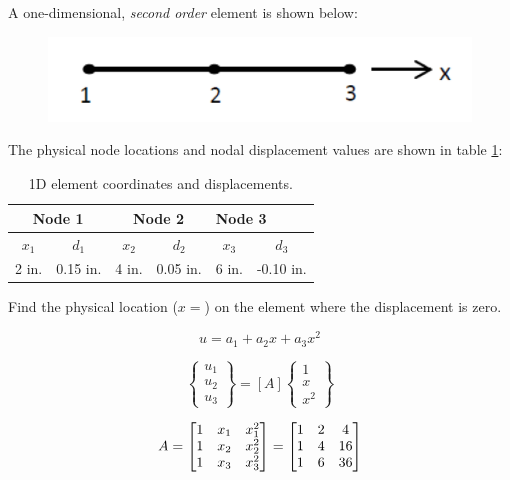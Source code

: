 \documentclass[../main.tex]{subfiles}
\begin{document}

A one-dimensional, \textit{second order} element is shown below:

\begin{figure}[h!]
    \centering
    \includegraphics[scale=0.4]{../../images/problem_2/1D_element}
\end{figure}

The physical node locations and nodal displacement values are shown in table \ref{1D_el}:

\begin{table}[h!]
    \centering
    \begin{tabular}{|c|c|c|c|c|c|}
    \hline
    \multicolumn{2}{|c|}{\textbf{Node 1}} & \multicolumn{2}{c|}{\textbf{Node 2}} & \multicolumn{2}{l|}{\textbf{Node 3}} \\ \hline
    \(x_1\) & \(d_1\) & \(x_2\) & \(d_2\) & \(x_3\) & \(d_3\) \\ \hline
    2 in. & 0.15 in. & 4 in. & 0.05 in. & 6 in. & -0.10 in. \\\hline
    \end{tabular}
    \caption{1D element coordinates and displacements.}
    \label{1D_el}
\end{table}

Find the physical location (\(x=\)) on the element where the displacement is zero.

\solution{}

\[
    u = a_1 + a_2x + a_3x^2
\]

\[
    \begin{Bmatrix}
        u_1 \\ u_2 \\u_3
    \end{Bmatrix}
     = [A]
     \begin{Bmatrix}
        1 \\ x \\x^2
    \end{Bmatrix}
\]

\[
    A = \mqty[
        1 & x_1 & x_1^2\\
        1 & x_2 & x_2^2\\
        1 & x_3 & x_3^2
    ]
    =
    \mqty[
        1 & 2 & 4\\
        1 & 4 & 16 \\
        1 & 6 & 36
    ]
\]
\end{document}

